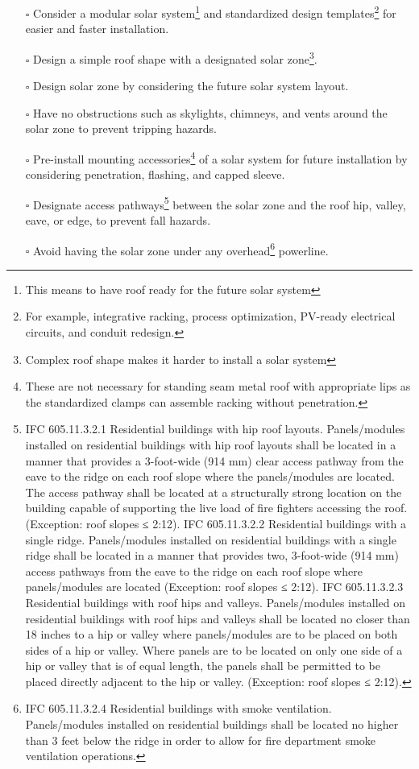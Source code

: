 \documentclass[]{article}
\providecommand{\tightlist}{%
  \setlength{\itemsep}{0pt}\setlength{\parskip}{0pt}}
\let\rmarkdownfootnote\footnote%
\def\footnote{\protect\rmarkdownfootnote}
\begin{document}
\begin{itemize}
\tightlist
\item[$\square$]
  Consider a modular solar system\footnote{This means to have roof ready
    for the future solar system} and standardized design
  templates\footnote{For example, integrative racking, process
    optimization, PV-ready electrical circuits, and conduit redesign.}
  for easier and faster installation.
\item[$\square$]
  Design a simple roof shape with a designated solar zone\footnote{Complex
    roof shape makes it harder to install a solar system}.
\item[$\square$]
  Design solar zone by considering the future solar system layout.
\item[$\square$]
  Have no obstructions such as skylights, chimneys, and vents around the
  solar zone to prevent tripping hazards.
\item[$\square$]
  Pre-install mounting accessories\footnote{These are not necessary for
    standing seam metal roof with appropriate lips as the standardized
    clamps can assemble racking without penetration.} of a solar system
  for future installation by considering penetration, flashing, and
  capped sleeve.
\item[$\square$]
  Designate access pathways\footnote{IFC 605.11.3.2.1 Residential
    buildings with hip roof layouts. Panels/modules installed on
    residential buildings with hip roof layouts shall be located in a
    manner that provides a 3-foot-wide (914 mm) clear access pathway
    from the eave to the ridge on each roof slope where the
    panels/modules are located. The access pathway shall be located at a
    structurally strong location on the building capable of supporting
    the live load of fire fighters accessing the roof. (Exception: roof
    slopes ≤ 2:12). IFC 605.11.3.2.2 Residential buildings with a single
    ridge. Panels/modules installed on residential buildings with a
    single ridge shall be located in a manner that provides two,
    3-foot-wide (914 mm) access pathways from the eave to the ridge on
    each roof slope where panels/modules are located (Exception: roof
    slopes ≤ 2:12). IFC 605.11.3.2.3 Residential buildings with roof
    hips and valleys. Panels/modules installed on residential buildings
    with roof hips and valleys shall be located no closer than 18 inches
    to a hip or valley where panels/modules are to be placed on both
    sides of a hip or valley. Where panels are to be located on only one
    side of a hip or valley that is of equal length, the panels shall be
    permitted to be placed directly adjacent to the hip or valley.
    (Exception: roof slopes ≤ 2:12).} between the solar zone and the
  roof hip, valley, eave, or edge, to prevent fall hazards.
\item[$\square$]
  Avoid having the solar zone under any overhead\footnote{IFC
    605.11.3.2.4 Residential buildings with smoke ventilation.
    Panels/modules installed on residential buildings shall be located
    no higher than 3 feet below the ridge in order to allow for fire
    department smoke ventilation operations.} powerline.
\end{itemize}
\end{document}
